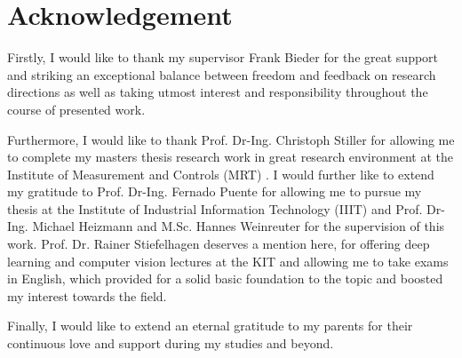 
\chapter*{Acknowledgement}

Firstly, I would like to thank my supervisor Frank Bieder for the great
support and striking an exceptional balance between freedom and feedback on research directions as well as taking utmost interest and responsibility throughout the course of presented work. 

Furthermore, I would like to thank Prof. Dr-Ing. Christoph Stiller for allowing me to complete my masters thesis research work in great research environment at the Institute of Measurement and Controls (MRT) . I would further like to extend my gratitude to Prof. Dr-Ing. Fernado Puente for allowing me to pursue my thesis at the Institute of Industrial Information Technology (IIIT) and Prof. Dr-Ing. Michael Heizmann and M.Sc. Hannes Weinreuter for the supervision of this work. Prof. Dr. Rainer Stiefelhagen deserves a mention here, for offering deep learning and computer vision lectures at the KIT and allowing me to take exams in English, which provided for a solid basic foundation to the topic and boosted my interest towards the field.



Finally, I would like to extend an eternal gratitude to my parents for their continuous love and support during my studies and beyond.


